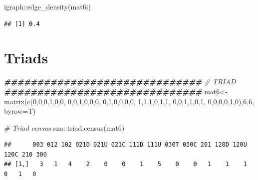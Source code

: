 \documentclass[
  notitlepage,
  onecolumn,
  openany]{book}
\newenvironment{Shaded}{\begin{snugshade}}{\end{snugshade}}
\newcommand{\AttributeTok}[1]{\textcolor[rgb]{0.77,0.63,0.00}{#1}}
\newcommand{\CommentTok}[1]{\textcolor[rgb]{0.56,0.35,0.01}{\textit{#1}}}
\newcommand{\DecValTok}[1]{\textcolor[rgb]{0.00,0.00,0.81}{#1}}
\newcommand{\DocumentationTok}[1]{\textcolor[rgb]{0.56,0.35,0.01}{\textbf{\textit{#1}}}}
\newcommand{\FunctionTok}[1]{\textcolor[rgb]{0.00,0.00,0.00}{#1}}
\newcommand{\NormalTok}[1]{#1}
\newcommand{\OtherTok}[1]{\textcolor[rgb]{0.56,0.35,0.01}{#1}}
\newcommand{\SpecialCharTok}[1]{\textcolor[rgb]{0.00,0.00,0.00}{#1}}
\begin{document}
\begin{Shaded}
\begin{Highlighting}[]
\NormalTok{igraph}\SpecialCharTok{::}\FunctionTok{edge\_density}\NormalTok{(mat6i)}
\end{Highlighting}
\end{Shaded}

\begin{verbatim}
## [1] 0.4
\end{verbatim}

\hypertarget{triads-1}{%
\chapter{Triads}\label{triads-1}}

\begin{Shaded}
\begin{Highlighting}[]
\DocumentationTok{\#\#\#\#\#\#\#\#\#\#\#\#\#\#\#\#\#\#\#\#\#\#\#\#\#\#\#\#\#\#}
\CommentTok{\# TRIAD}
\DocumentationTok{\#\#\#\#\#\#\#\#\#\#\#\#\#\#\#\#\#\#\#\#\#\#\#\#\#\#\#\#\#\#}
\NormalTok{mat6}\OtherTok{\textless{}{-}}\FunctionTok{matrix}\NormalTok{(}\FunctionTok{c}\NormalTok{(}\DecValTok{0}\NormalTok{,}\DecValTok{0}\NormalTok{,}\DecValTok{0}\NormalTok{,}\DecValTok{1}\NormalTok{,}\DecValTok{0}\NormalTok{,}\DecValTok{0}\NormalTok{,}
               \DecValTok{0}\NormalTok{,}\DecValTok{0}\NormalTok{,}\DecValTok{1}\NormalTok{,}\DecValTok{0}\NormalTok{,}\DecValTok{0}\NormalTok{,}\DecValTok{0}\NormalTok{,}
               \DecValTok{0}\NormalTok{,}\DecValTok{1}\NormalTok{,}\DecValTok{0}\NormalTok{,}\DecValTok{0}\NormalTok{,}\DecValTok{0}\NormalTok{,}\DecValTok{0}\NormalTok{,}
               \DecValTok{1}\NormalTok{,}\DecValTok{1}\NormalTok{,}\DecValTok{1}\NormalTok{,}\DecValTok{0}\NormalTok{,}\DecValTok{1}\NormalTok{,}\DecValTok{1}\NormalTok{,}
               \DecValTok{0}\NormalTok{,}\DecValTok{0}\NormalTok{,}\DecValTok{1}\NormalTok{,}\DecValTok{1}\NormalTok{,}\DecValTok{0}\NormalTok{,}\DecValTok{1}\NormalTok{,}
               \DecValTok{0}\NormalTok{,}\DecValTok{0}\NormalTok{,}\DecValTok{0}\NormalTok{,}\DecValTok{0}\NormalTok{,}\DecValTok{1}\NormalTok{,}\DecValTok{0}\NormalTok{),}\DecValTok{6}\NormalTok{,}\DecValTok{6}\NormalTok{, }\AttributeTok{byrow=}\NormalTok{T)}

\CommentTok{\# Triad census}
\NormalTok{sna}\SpecialCharTok{::}\FunctionTok{triad.census}\NormalTok{(mat6)}
\end{Highlighting}
\end{Shaded}

\begin{verbatim}
##      003 012 102 021D 021U 021C 111D 111U 030T 030C 201 120D 120U 120C 210 300
## [1,]   3   1   4    2    0    0    1    5    0    0   1    1    1    0   1   0
\end{verbatim}
\end{document}
